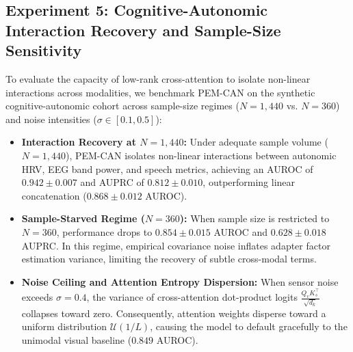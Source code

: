 \documentclass[a4paper,fleqn]{cas-dc}
\begin{document}
\begin{table}[t]
\centering
\caption{Experiment 4: Component Ablation Study on Held-Out Test Cohort.}
\label{tab:exp3_ablation}
\end{table}

\subsection{Experiment 5: Cognitive-Autonomic Interaction Recovery and Sample-Size Sensitivity}
\label{sec:exp5_cognitive}
To evaluate the capacity of low-rank cross-attention to isolate non-linear interactions across modalities, we benchmark PEM-CAN on the synthetic cognitive-autonomic cohort across sample-size regimes ($N=1{,}440$ vs. $N=360$) and noise intensities ($\sigma \in [0.1, 0.5]$):
\begin{itemize}
    \item \textbf{Interaction Recovery at $N=1{,}440$:} Under adequate sample volume ($N=1{,}440$), PEM-CAN isolates non-linear interactions between autonomic HRV, EEG band power, and speech metrics, achieving an AUROC of $0.942 \pm 0.007$ and AUPRC of $0.812 \pm 0.010$, outperforming linear concatenation ($0.868 \pm 0.012$ AUROC).
    \item \textbf{Sample-Starved Regime ($N=360$):} When sample size is restricted to $N=360$, performance drops to $0.854 \pm 0.015$ AUROC and $0.628 \pm 0.018$ AUPRC. In this regime, empirical covariance noise inflates adapter factor estimation variance, limiting the recovery of subtle cross-modal terms.
    \item \textbf{Noise Ceiling and Attention Entropy Dispersion:} When sensor noise exceeds $\sigma = 0.4$, the variance of cross-attention dot-product logits $\frac{Q_v K_s^\top}{\sqrt{d_k}}$ collapses toward zero. Consequently, attention weights disperse toward a uniform distribution $\mathcal{U}(1/L)$, causing the model to default gracefully to the unimodal visual baseline ($0.849$ AUROC).
\end{itemize}
\end{document}
